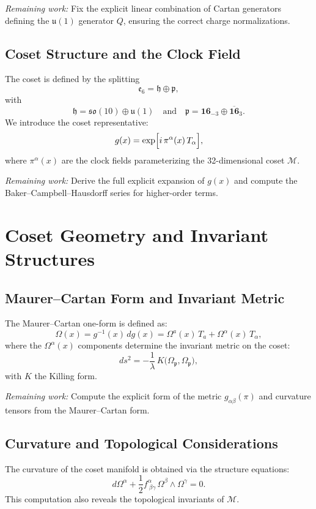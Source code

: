 \documentclass[aps,prd,preprint,groupedaddress]{revtex4-2}
\begin{document}
\emph{Remaining work:} Fix the explicit linear combination of Cartan generators defining the $\mathfrak{u}(1)$ generator $Q$, ensuring the correct charge normalizations.

\subsection{Coset Structure and the Clock Field}
The coset is defined by the splitting
\[
\mathfrak{e}_6 = \mathfrak{h} \oplus \mathfrak{p},
\]
with
\[
\mathfrak{h} = \mathfrak{so}(10)\oplus \mathfrak{u}(1) \quad \text{and} \quad \mathfrak{p} = \mathbf{16}_{-3}\oplus\overline{\mathbf{16}}_{3}.
\]
We introduce the coset representative:
\[
g(x) = \exp\Bigl[i\,\pi^\alpha(x)\,T_\alpha\Bigr],
\]
where $\pi^\alpha(x)$ are the clock fields parameterizing the 32-dimensional coset $\mathcal{M}$.

\emph{Remaining work:} Derive the full explicit expansion of $g(x)$ and compute the Baker--Campbell--Hausdorff series for higher-order terms.

\section{Coset Geometry and Invariant Structures}

\subsection{Maurer--Cartan Form and Invariant Metric}
The Maurer--Cartan one-form is defined as:
\[
\Omega(x) = g^{-1}(x)\,dg(x) = \Omega^a(x)\,T_a + \Omega^\alpha(x)\,T_\alpha,
\]
where the $\Omega^\alpha(x)$ components determine the invariant metric on the coset:
\[
ds^2 = -\frac{1}{\lambda} \, K\bigl(\Omega_{\mathfrak{p}}, \Omega_{\mathfrak{p}}\bigr),
\]
with $K$ the Killing form.

\emph{Remaining work:} Compute the explicit form of the metric $g_{\alpha\beta}(\pi)$ and curvature tensors from the Maurer--Cartan form.

\subsection{Curvature and Topological Considerations}
The curvature of the coset manifold is obtained via the structure equations:
\[
d\Omega^\alpha + \frac{1}{2} f^\alpha_{\ \beta\gamma}\,\Omega^\beta \wedge \Omega^\gamma = 0.
\]
This computation also reveals the topological invariants of $\mathcal{M}$.
\end{document}
